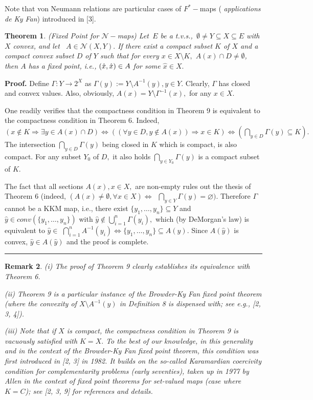 \documentclass{article}
\newtheorem{theorem}{Theorem}
\newtheorem{remark}[theorem]{Remark}
\newenvironment{proof}[1][Proof]{\noindent\textbf{#1.} }{\ \rule{0.5em}{0.5em}}
\begin{document}
Note that von Neumann relations are particular cases of $F^{\ast }-$maps (%
\textit{applications de Ky Fan}) introduced in [3].

\begin{theorem}
(Fixed Point for $\mathcal{N}-$maps) Let\textit{\ }$E$ be a t.v.s.,\textit{\ 
}$\emptyset \neq Y\subseteq X\subseteq E$ with $X$ convex, and let\textit{\ }%
$A\in \mathcal{N}(X,Y).$ If there exist a compact subset $K$ of $X$ and a
compact convex subset $D$ of $Y$ such that for every $x\in X\setminus K,$ $%
A(x)\cap D\neq \emptyset $, then $A$ has a fixed point, i.e., $(\hat{x},\hat{%
x})\in A$ for some $\hat{x}\in X.$
\end{theorem}

\begin{proof}
Define $\Gamma :Y\longrightarrow 2^{X}$ as $\Gamma (y):=Y\setminus
A^{-1}(y),y\in Y.$ Clearly, $\Gamma $ has closed and convex values. Also,
obviously, $A(x)=Y\setminus \Gamma ^{-1}(x),$ for any $x\in X.$

One readily verifies that the compactness condition in Theorem 9 is
equivalent to the compactness condition in Theorem 6. Indeed, $(x\notin
K\Longrightarrow \exists y\in A(x)\cap D)\Longleftrightarrow ((\forall y\in
D,y\notin A(x))\Longrightarrow x\in K)\Longleftrightarrow (\bigcap_{y\in
D}\Gamma (y)\subseteq K).$ The intersection $\bigcap_{y\in D}\Gamma (y)$
being closed in $K$ which is compact, is also compact. For any subset $Y_{0}$
of $D,$ it also holds $\bigcap_{y\in Y_{0}}\Gamma (y)$ is a compact subset
of $K.$

The fact that all sections $A(x),x\in X,$ are non-empty rules out the thesis
of Theorem 6 (indeed, $(A(x)\neq \emptyset ,\forall x\in
X)\Longleftrightarrow $\textit{\ }$\bigcap_{y\in Y}\Gamma (y)=\varnothing ).$
Therefore $\Gamma $ cannot be a KKM map, i.e., there exist $\{y_{1},\ldots
,y_{n}\}\subseteq Y$ and $\hat{y}\in conv(\{y_{1},\ldots ,y_{n}\})$ with $%
\hat{y}\notin \bigcup_{i=1}^{n}\Gamma (y_{i}),$ which (by DeMorgan's law) is
equivalent to $\hat{y}\in $ $\bigcap_{i=1}^{n}A^{-1}(y_{i})%
\Longleftrightarrow \{y_{1},\ldots ,y_{n}\}\subseteq A(\hat{y}).$ Since $A(%
\hat{y})$ is convex, $\hat{y}\in A(\hat{y})\,\ $and the proof is complete.
\end{proof}

\begin{remark}
(i) The proof of Theorem 9 clearly establishes its equivalence with Theorem
6.

(ii) Theorem 9 is a particular instance of the Browder-Ky Fan fixed point
theorem (where the convexity of $X\setminus A^{-1}(y)$ in Definition 8 is
dispensed with; see e.g., [2, 3, 4]).

(iii) Note that if $X$ is compact, the compactness condition in Theorem 9 is
vacuously satisfied with $K=X.$ To the best of our knowledge, in this
generality and in the context of the Browder-Ky Fan fixed point theorem,
this condition was first introduced in [2, 3] in 1982. It builds on the
so-called Karamardian \textit{coercivity condition} for complementarity
problems (early seventies), taken up in 1977 by Allen in the context of
fixed point theorems for set-valued maps (case where $K=C$); see [2, 3, 9]
for references and details.
\end{remark}
\end{document}
